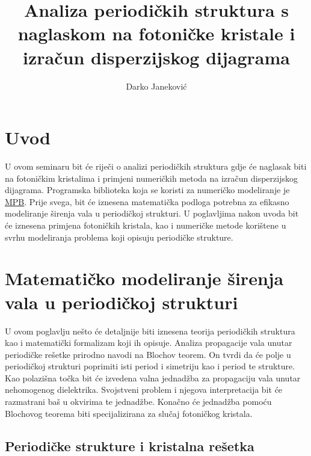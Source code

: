 \documentclass[utf8, seminar]{fer}
\begin{document}
\title{Analiza periodičkih struktura s naglaskom na fotoničke kristale
	   i izračun disperzijskog dijagrama}
\author{Darko Janeković}

\maketitle

\tableofcontents


\chapter{Uvod}
U ovom seminaru bit će riječi o analizi periodičkih struktura gdje će naglasak
biti na fotoničkim kristalima i primjeni numeričkih metoda na izračun
disperzijskog dijagrama. Programska biblioteka koja se koristi za numeričko
modeliranje je \href{https://github.com/stevengj/mpb}{MPB}. Prije svega, bit će
iznesena matematička podloga potrebna za efikasno modeliranje širenja vala u
periodičkoj strukturi. U poglavljima nakon uvoda bit će iznesena primjena
fotoničkih kristala, kao i numeričke metode korištene u svrhu modeliranja
problema koji opisuju periodičke strukture.


\chapter{Matematičko modeliranje širenja vala u periodičkoj strukturi}


U ovom poglavlju nešto će detaljnije biti iznesena teorija periodičkih struktura
kao i matematički formalizam koji ih opisuje. Analiza propagacije vala unutar
periodičke rešetke prirodno navodi na Blochov teorem. On tvrdi da će polje u
periodičkoj strukturi poprimiti isti period i simetriju kao i period te strukture.
Kao polazišna točka bit će izvedena valna jednadžba za propagaciju vala unutar
nehomogenog dielektrika. Svojstveni problem i njegova interpretacija bit će
razmatrani baš u okvirima te jednadžbe. Konačno će jednadžba pomoću Blochovog
teorema biti specijalizirana za slučaj fotoničkog kristala.


\section{Periodičke strukture i kristalna rešetka}
\end{document}
